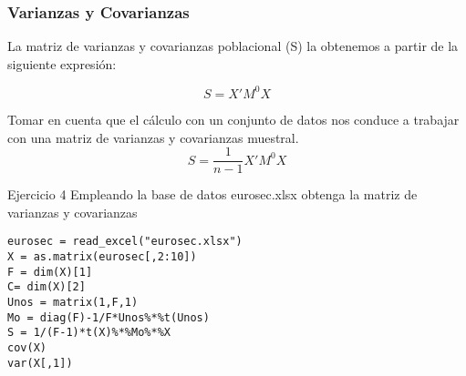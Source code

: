 \documentclass[16.5pt]{beamer}
\begin{document}
{
\begin{frame}
\frametitle{\textbf{Varianzas y Covarianzas}}
\hspace*{-5mm}
\vspace*{-2mm} 
\vspace{0.3cm}

La matriz de varianzas y covarianzas poblacional (S) la obtenemos a partir de la siguiente expresión:

\tiny
$$S = X'M^0X $$
\normalsize

Tomar en cuenta que el cálculo con un conjunto de datos nos conduce a trabajar con una matriz de varianzas y covarianzas muestral.
\tiny
$$S = \frac{1}{n-1}X'M^0X $$
\normalsize

\begin{bclogo}{Ejercicio 4}
 {\tiny\color{blue} Empleando la base de datos eurosec.xlsx obtenga la matriz de varianzas y covarianzas}
\begin{lstlisting}[basicstyle=\tiny]
eurosec = read_excel("eurosec.xlsx")
X = as.matrix(eurosec[,2:10])
F = dim(X)[1]
C= dim(X)[2]
Unos = matrix(1,F,1)
Mo = diag(F)-1/F*Unos%*%t(Unos)
S = 1/(F-1)*t(X)%*%Mo%*%X
cov(X)
var(X[,1])
\end{lstlisting}
\end{bclogo}

\end{frame}
}
\end{document}
